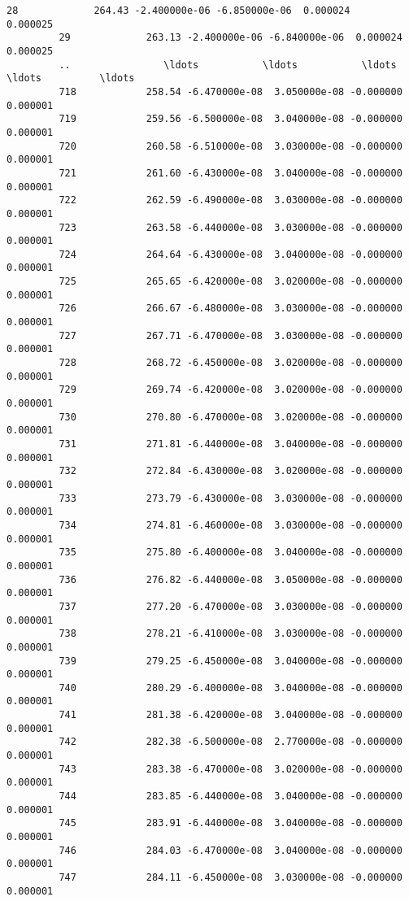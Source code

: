 \documentclass{article}
\begin{document}
\begin{Verbatim}[commandchars=\\\{\}]
         28             264.43 -2.400000e-06 -6.850000e-06  0.000024     0.000025   
         29             263.13 -2.400000e-06 -6.840000e-06  0.000024     0.000025   
         ..                \ldots           \ldots           \ldots       \ldots          \ldots   
         718            258.54 -6.470000e-08  3.050000e-08 -0.000000     0.000001   
         719            259.56 -6.500000e-08  3.040000e-08 -0.000000     0.000001   
         720            260.58 -6.510000e-08  3.030000e-08 -0.000000     0.000001   
         721            261.60 -6.430000e-08  3.040000e-08 -0.000000     0.000001   
         722            262.59 -6.490000e-08  3.030000e-08 -0.000000     0.000001   
         723            263.58 -6.440000e-08  3.030000e-08 -0.000000     0.000001   
         724            264.64 -6.430000e-08  3.040000e-08 -0.000000     0.000001   
         725            265.65 -6.420000e-08  3.020000e-08 -0.000000     0.000001   
         726            266.67 -6.480000e-08  3.030000e-08 -0.000000     0.000001   
         727            267.71 -6.470000e-08  3.030000e-08 -0.000000     0.000001   
         728            268.72 -6.450000e-08  3.020000e-08 -0.000000     0.000001   
         729            269.74 -6.420000e-08  3.020000e-08 -0.000000     0.000001   
         730            270.80 -6.470000e-08  3.020000e-08 -0.000000     0.000001   
         731            271.81 -6.440000e-08  3.040000e-08 -0.000000     0.000001   
         732            272.84 -6.430000e-08  3.020000e-08 -0.000000     0.000001   
         733            273.79 -6.430000e-08  3.030000e-08 -0.000000     0.000001   
         734            274.81 -6.460000e-08  3.030000e-08 -0.000000     0.000001   
         735            275.80 -6.400000e-08  3.040000e-08 -0.000000     0.000001   
         736            276.82 -6.440000e-08  3.050000e-08 -0.000000     0.000001   
         737            277.20 -6.470000e-08  3.030000e-08 -0.000000     0.000001   
         738            278.21 -6.410000e-08  3.030000e-08 -0.000000     0.000001   
         739            279.25 -6.450000e-08  3.040000e-08 -0.000000     0.000001   
         740            280.29 -6.400000e-08  3.040000e-08 -0.000000     0.000001   
         741            281.38 -6.420000e-08  3.040000e-08 -0.000000     0.000001   
         742            282.38 -6.500000e-08  2.770000e-08 -0.000000     0.000001   
         743            283.38 -6.470000e-08  3.020000e-08 -0.000000     0.000001   
         744            283.85 -6.440000e-08  3.040000e-08 -0.000000     0.000001   
         745            283.91 -6.440000e-08  3.040000e-08 -0.000000     0.000001   
         746            284.03 -6.470000e-08  3.040000e-08 -0.000000     0.000001   
         747            284.11 -6.450000e-08  3.030000e-08 -0.000000     0.000001   
         

\end{Verbatim}
\end{document}
